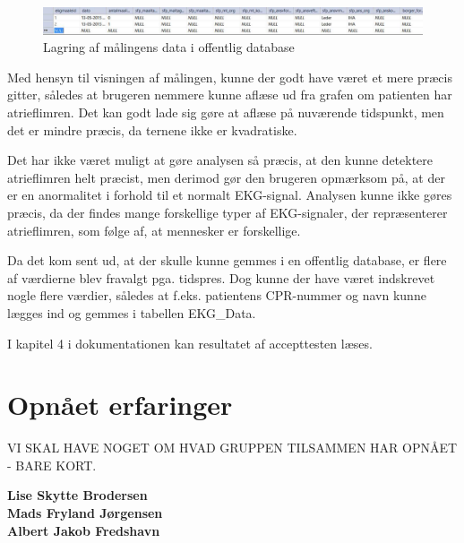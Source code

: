 \begin{figure}[H]
	\centering
	\includegraphics[width=1\textwidth]{Figurer/Snip20150525_29}
	\caption{Lagring af målingens data i offentlig database}
\end{figure}

Med hensyn til visningen af målingen, kunne der godt have været et mere præcis gitter, således at brugeren nemmere kunne aflæse ud fra grafen om patienten har atrieflimren. Det kan godt lade sig gøre at aflæse på nuværende tidspunkt, men det er mindre præcis, da ternene ikke er kvadratiske.

Det har ikke været muligt at gøre analysen så præcis, at den kunne detektere atrieflimren helt præcist, men derimod gør den brugeren opmærksom på, at der er en anormalitet i forhold til et normalt EKG-signal. Analysen kunne ikke gøres præcis, da der findes mange forskellige typer af EKG-signaler, der repræsenterer atrieflimren, som følge af, at mennesker er forskellige.

Da det kom sent ud, at der skulle kunne gemmes i en offentlig database, er flere af værdierne blev fravalgt pga. tidspres. Dog kunne der have været indskrevet nogle flere værdier, således at f.eks. patientens CPR-nummer og navn kunne lægges ind og gemmes i tabellen EKG\_Data.

I kapitel 4 i dokumentationen kan resultatet af accepttesten læses. 


\section{Opnået erfaringer}

VI SKAL HAVE NOGET OM HVAD GRUPPEN TILSAMMEN HAR OPNÅET - BARE KORT. 


\textbf{Lise Skytte Brodersen}\\

\textbf{Mads Fryland Jørgensen}\\

\textbf{Albert Jakob Fredshavn}\\

